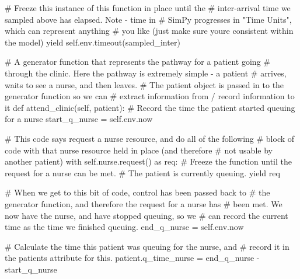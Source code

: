 \documentclass[
  letterpaper,
  DIV=11,
  numbers=noendperiod]{scrreprt}
\newenvironment{Shaded}{}{}
\newcommand{\CommentTok}[1]{\textcolor[rgb]{0.42,0.45,0.49}{#1}}
\newcommand{\ControlFlowTok}[1]{\textcolor[rgb]{0.84,0.23,0.29}{#1}}
\newcommand{\ImportTok}[1]{\textcolor[rgb]{0.01,0.18,0.38}{#1}}
\newcommand{\KeywordTok}[1]{\textcolor[rgb]{0.84,0.23,0.29}{#1}}
\newcommand{\NormalTok}[1]{\textcolor[rgb]{0.14,0.16,0.18}{#1}}
\newcommand{\OperatorTok}[1]{\textcolor[rgb]{0.14,0.16,0.18}{#1}}
\newcommand{\VariableTok}[1]{\textcolor[rgb]{0.89,0.38,0.04}{#1}}
\begin{document}
\begin{tcolorbox}
\begin{Shaded}
\begin{Highlighting}[]
            \CommentTok{\# Freeze this instance of this function in place until the}
            \CommentTok{\# inter{-}arrival time we sampled above has elapsed.  Note {-} time in}
            \CommentTok{\# SimPy progresses in "Time Units", which can represent anything}
            \CommentTok{\# you like (just make sure you\textquotesingle{}re consistent within the model)}
            \ControlFlowTok{yield} \VariableTok{self}\NormalTok{.env.timeout(sampled\_inter)}

    \CommentTok{\# A generator function that represents the pathway for a patient going}
    \CommentTok{\# through the clinic.  Here the pathway is extremely simple {-} a patient}
    \CommentTok{\# arrives, waits to see a nurse, and then leaves.}
    \CommentTok{\# The patient object is passed in to the generator function so we can}
    \CommentTok{\# extract information from / record information to it}
    \KeywordTok{def}\NormalTok{ attend\_clinic(}\VariableTok{self}\NormalTok{, patient):}
        \CommentTok{\# Record the time the patient started queuing for a nurse}
\NormalTok{        start\_q\_nurse }\OperatorTok{=} \VariableTok{self}\NormalTok{.env.now}

        \CommentTok{\# This code says request a nurse resource, and do all of the following}
        \CommentTok{\# block of code with that nurse resource held in place (and therefore}
        \CommentTok{\# not usable by another patient)}
        \ControlFlowTok{with} \VariableTok{self}\NormalTok{.nurse.request() }\ImportTok{as}\NormalTok{ req:}
            \CommentTok{\# Freeze the function until the request for a nurse can be met.}
            \CommentTok{\# The patient is currently queuing.}
            \ControlFlowTok{yield}\NormalTok{ req}

            \CommentTok{\# When we get to this bit of code, control has been passed back to}
            \CommentTok{\# the generator function, and therefore the request for a nurse has}
            \CommentTok{\# been met.  We now have the nurse, and have stopped queuing, so we}
            \CommentTok{\# can record the current time as the time we finished queuing.}
\NormalTok{            end\_q\_nurse }\OperatorTok{=} \VariableTok{self}\NormalTok{.env.now}

            \CommentTok{\# Calculate the time this patient was queuing for the nurse, and}
            \CommentTok{\# record it in the patient\textquotesingle{}s attribute for this.}
\NormalTok{            patient.q\_time\_nurse }\OperatorTok{=}\NormalTok{ end\_q\_nurse }\OperatorTok{{-}}\NormalTok{ start\_q\_nurse}


\end{Highlighting}
\end{Shaded}
\end{tcolorbox}
\end{document}
